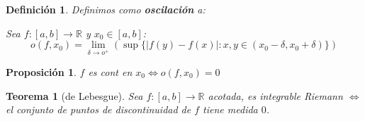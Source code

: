 \documentclass[10pt,a4paper,openright]{book}
\theoremstyle{break}
\newtheorem*{defi}{Definición}
\newtheorem*{theo}{Teorema}
\newtheorem*{prop}{Proposición}
\begin{document}
\begin{defi}
Definimos como \textbf{oscilación} a: 

Sea $f: \left[a, b\right] \to \mathbb{R}$ y $x_0 \in \left[a, b\right]$:
$$o\left(f, x_0\right) = \lim_{\delta \to o^+} \left(\sup \{ \vert f\left(y\right) - f\left(x\right) \vert : x, y \in \left(x_0 -\delta, x_0 + \delta \right) \} \right)$$
\end{defi}

\begin{prop}
$f$ es cont en $x_0 \iff o\left(f, x_0\right) = 0$
\end{prop}

\begin{theo}[de Lebesgue]
Sea $f: \left[a, b\right] \to \mathbb{R}$ acotada, es integrable Riemann $\iff$ el conjunto de puntos de discontinuidad de $f$ tiene medida $0$.
\end{theo}
\end{document}
